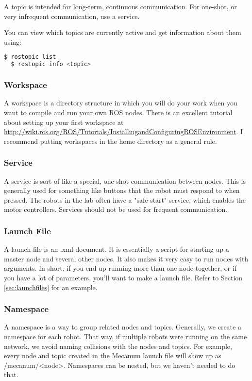 A topic is intended for long-term, continuous communication. For one-shot, or very infrequent communication, use a service.

You can view which topics are currently active and get information about them using:

\begin{lstlisting}[language=bash]
  $ rostopic list
  $ rostopic info <topic>
\end{lstlisting}

\subsubsection{Workspace}

A workspace is a directory structure in which you will do your work when you want to compile and run your own ROS nodes. There is an excellent tutorial about setting up your first workspace at \url{http://wiki.ros.org/ROS/Tutorials/InstallingandConfiguringROSEnvironment}. I recommend putting workspaces in the home directory as a general rule.

\subsubsection{Service}

A service is sort of like a special, one-shot communication between nodes. This is generally used for something like buttons that the robot must respond to when pressed. The robots in the lab often have a "safe-start" service, which enables the motor controllers. Services should not be used for frequent communication.

\subsubsection{Launch File}

A launch file is an .xml document. It is essentially a script for starting up a master node and several other nodes. It also makes it very easy to run nodes with arguments. In short, if you end up running more than one node together, or if you have a lot of parameters, you'll want to make a launch file. Refer to Section \ref{sec:launchfiles} for an example.

\subsubsection{Namespace}

A namespace is a way to group related nodes and topics. Generally, we create a namespace for each robot. That way, if multiple robots were running on the same network, we avoid naming collisions with the nodes and topics. For example, every node and topic created in the Mecanum launch file will show up as /mecanum/<node>. Namespaces can be nested, but we haven't needed to do that.


